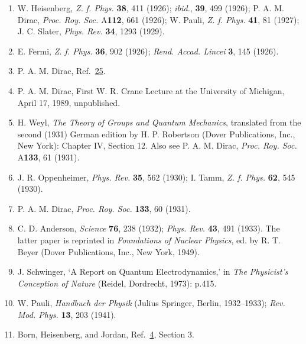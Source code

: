 \begin{enumerate}
\item\label{ref:1.25} W. Heisenberg, \emph{Z. f. Phys.} \textbf{38}, 411 (1926); \emph{ibid.},
\textbf{39}, 499 (1926); P. A. M. Dirac, \emph{Proc. Roy. Soc.}
A\textbf{112}, 661 (1926); W. Pauli, \emph{Z. f. Phys.} \textbf{41}, 81
(1927); J. C. Slater, \emph{Phys. Rev.} \textbf{34}, 1293 (1929).

\item\label{ref:1.26} E. Fermi, \emph{Z. f. Phys.} \textbf{36}, 902 (1926); \emph{Rend.
Accad. Lincei} \textbf{3}, 145 (1926).

\item\label{ref:1.27} P. A. M. Dirac, Ref.~\hyperref[ref:1.25]{25}.

\item[27a.]\label{ref:1.27a} P. A. M. Dirac, First W. R. Crane Lecture at the University of
Michigan, April 17, 1989, unpublished.

\item\label{ref:1.28} H. Weyl, \emph{The Theory of Groups and Quantum Mechanics}, translated
from the second (1931) German edition by H. P. Robertson (Dover Publications,
Inc., New York): Chapter IV, Section 12. Also see P. A. M. Dirac, \emph{Proc.
Roy. Soc.} A\textbf{133}, 61 (1931).

\item\label{ref:1.29} J. R. Oppenheimer, \emph{Phys. Rev.} \textbf{35}, 562 (1930); I. Tamm,
\emph{Z. f. Phys.} \textbf{62}, 545 (1930).

\item[29a.]\label{ref:1.29a} P. A. M. Dirac, \emph{Proc. Roy. Soc.} \textbf{133}, 60 (1931).

\item\label{ref:1.30} C. D. Anderson, \emph{Science} \textbf{76}, 238 (1932); \emph{Phys.
Rev.} \textbf{43}, 491 (1933). The latter paper is reprinted in \emph{Foundations
of Nuclear Physics}, ed. by R. T. Beyer (Dover Publications, Inc., New York,
1949).

\item[30a.]\label{ref:1.30a} J. Schwinger, `A Report on Quantum Electrodynamics,' in \emph{The
Physicist's Conception of Nature} (Reidel, Dordrecht, 1973): p.415.

\item\label{ref:1.31} W. Pauli, \emph{Handbuch der Physik} (Julius Springer, Berlin,
1932--1933); \emph{Rev. Mod. Phys.} \textbf{13}, 203 (1941).

\item\label{ref:1.32} Born, Heisenberg, and Jordan, Ref.~\hyperref[ref:1.4]{4}, Section 3.


\end{enumerate}
